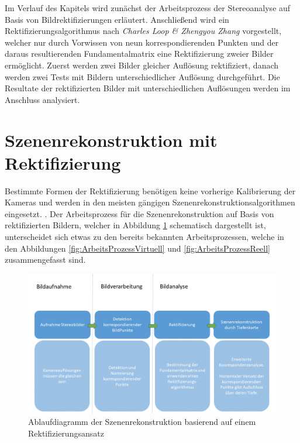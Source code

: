 
Im Verlauf des Kapitels wird zunächst der Arbeitsprozess der Stereoanalyse auf Basis von Bildrektifizierungen erläutert. Anschließend wird ein Rektifizierungsalgorithmus nach \textit{Charles Loop \& Zhengyou Zhang}\cite{ZZ} vorgestellt, welcher nur durch Vorwissen von neun korrespondierenden Punkten und der daraus resultierenden Fundamentalmatrix eine Rektifizierung zweier Bilder ermöglicht. Zuerst werden zwei Bilder gleicher Auflösung rektifiziert, danach werden zwei Tests mit Bildern unterschiedlicher Auflösung durchgeführt. Die Resultate der rektifizierten Bilder mit unterschiedlichen Auflösungen werden im Anschluss analysiert.



%

\section{Szenenrekonstruktion mit Rektifizierung}


Bestimmte Formen der Rektifizierung benötigen keine vorherige Kalibrierung der Kameras und werden in den meisten gängigen Szenenrekonstruktionsalgorithmen eingesetzt. \cite{Fusiello,Javier,R.H.}. Der Arbeitsprozess für die Szenenrekonstruktion auf Basis von rektifizierten Bildern, welcher in Abbildung \ref{fig:ArbeitsprozessRektifizierung} schematisch dargestellt ist, unterscheidet sich etwas zu den bereits bekannten Arbeitsprozessen, welche in den Abbildungen \ref{fig:ArbeitsProzessVirtuell} und \ref{fig:ArbeitsProzessReell} zusammengefasst sind.\\


\begin{figure}[!htb]
	\centering
	\includegraphics[width=.8\linewidth]{images/NEU_Rektifizierung_Arbeitsprozess.png}
	\caption[Arbeitsprozess der Szenenrekonstruktion mit Rektifizierung]{Ablaufdiagramm der Szenenrekonstruktion basierend auf einem Rektifizierungsansatz} 
	\label{fig:ArbeitsprozessRektifizierung}
\end{figure}
\pagebreak


